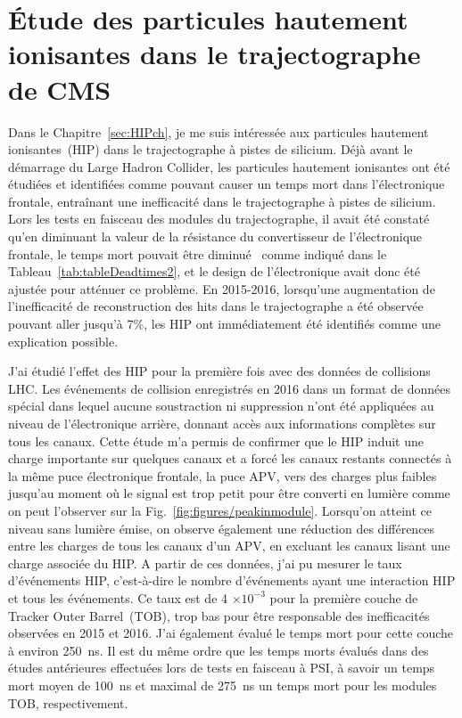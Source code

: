 \section{Étude des particules hautement ionisantes dans le trajectographe de CMS}

Dans le Chapitre~\ref{sec:HIPch}, je me suis intéressée aux particules hautement ionisantes~(HIP) dans le trajectographe à pistes de silicium. Déjà avant le démarrage du Large Hadron Collider, les particules hautement ionisantes ont été étudiées et identifiées comme pouvant causer un temps mort dans l'électronique frontale, entraînant une inefficacité dans le trajectographe à pistes de silicium. Lors les tests en faisceau des modules du trajectographe, il avait été constaté qu'en diminuant la valeur de la résistance du convertisseur de l’électronique frontale, le temps mort pouvait être diminué~\cite{Bainbridge:2004jc} comme indiqué dans le Tableau~\ref{tab:tableDeadtimes2}, et le design de l'électronique avait donc été ajustée pour atténuer ce problème. En 2015-2016, lorsqu'une augmentation de l'inefficacité de reconstruction des hits dans le trajectographe a été observée pouvant aller jusqu'à 7\%, les HIP ont immédiatement été identifiés comme une explication possible. 

J'ai étudié l'effet des HIP pour la première fois avec des données de collisions LHC. Les  événements de collision enregistrés en 2016 dans un format de données spécial dans lequel aucune soustraction ni suppression n'ont été appliquées au niveau de l'électronique arrière, donnant accès aux informations complètes sur tous les canaux. Cette étude m'a permis de confirmer que le HIP induit une charge importante sur quelques canaux et a forcé les canaux restants connectés à la même puce électronique frontale, la puce APV, vers des charges plus faibles jusqu'au moment où le signal est trop petit pour être converti en lumière comme on peut l'observer sur la Fig.~\ref{fig:figures/peakinmodule}. Lorsqu'on atteint ce niveau sans lumière émise, on observe également une réduction des différences entre les charges de tous les canaux d'un APV, en excluant les canaux lisant une charge associée du HIP. A partir de ces données, j'ai pu mesurer le taux d'événements HIP, c'est-à-dire le nombre d'événements ayant une interaction HIP et  tous les événements. Ce taux est de 4 $\times 10^{-3} $ pour la première couche de Tracker Outer Barrel~(TOB), trop bas pour être responsable des inefficacités observées en 2015 et 2016. J'ai également évalué le temps mort pour cette couche à environ 250~ns. Il est du même ordre que les temps morts évalués dans des études antérieures effectuées lors de tests en faisceau à PSI, à savoir un temps mort moyen de 100~ns et maximal de 275~ns un temps mort pour les modules TOB, respectivement.

